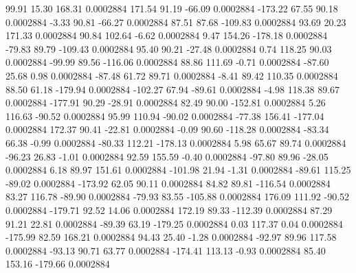        99.91       15.30      168.31     0.0002884
      171.54       91.19      -66.09     0.0002884
     -173.22       67.55       90.18     0.0002884
       -3.33       90.81      -66.27     0.0002884
       87.51       87.68     -109.83     0.0002884
       93.69       20.23      171.33     0.0002884
       90.84      102.64       -6.62     0.0002884
        9.47      154.26     -178.18     0.0002884
      -79.83       89.79     -109.43     0.0002884
       95.40       90.21      -27.48     0.0002884
        0.74      118.25       90.03     0.0002884
      -99.99       89.56     -116.06     0.0002884
       88.86      111.69       -0.71     0.0002884
      -87.60       25.68        0.98     0.0002884
      -87.48       61.72       89.71     0.0002884
       -8.41       89.42      110.35     0.0002884
       88.50       61.18     -179.94     0.0002884
     -102.27       67.94      -89.61     0.0002884
       -4.98      118.38       89.67     0.0002884
     -177.91       90.29      -28.91     0.0002884
       82.49       90.00     -152.81     0.0002884
        5.26      116.63      -90.52     0.0002884
       95.99      110.94      -90.02     0.0002884
      -77.38      156.41     -177.04     0.0002884
      172.37       90.41      -22.81     0.0002884
       -0.09       90.60     -118.28     0.0002884
      -83.34       66.38       -0.99     0.0002884
      -80.33      112.21     -178.13     0.0002884
        5.98       65.67       89.74     0.0002884
      -96.23       26.83       -1.01     0.0002884
       92.59      155.59       -0.40     0.0002884
      -97.80       89.96      -28.05     0.0002884
        6.18       89.97      151.61     0.0002884
     -101.98       21.94       -1.31     0.0002884
      -89.61      115.25      -89.02     0.0002884
     -173.92       62.05       90.11     0.0002884
       84.82       89.81     -116.54     0.0002884
       83.27      116.78      -89.90     0.0002884
      -79.93       83.55     -105.88     0.0002884
      176.09      111.92      -90.52     0.0002884
     -179.71       92.52       14.06     0.0002884
      172.19       89.33     -112.39     0.0002884
       87.29       91.21       22.81     0.0002884
      -89.39       63.19     -179.25     0.0002884
        0.03      117.37        0.04     0.0002884
     -175.99       82.59      168.21     0.0002884
       94.43       25.40       -1.28     0.0002884
      -92.97       89.96      117.58     0.0002884
      -93.13       90.71       63.77     0.0002884
     -174.41      113.13       -0.93     0.0002884
       85.40      153.16     -179.66     0.0002884
